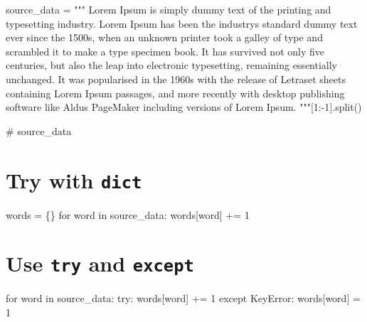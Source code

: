\documentclass[
  letterpaper,
  DIV=11,
  numbers=noendperiod]{scrreprt}
\newenvironment{Shaded}{\begin{snugshade}}{\end{snugshade}}
\newcommand{\CommentTok}[1]{\textcolor[rgb]{0.37,0.37,0.37}{#1}}
\newcommand{\ControlFlowTok}[1]{\textcolor[rgb]{0.00,0.23,0.31}{#1}}
\newcommand{\DecValTok}[1]{\textcolor[rgb]{0.68,0.00,0.00}{#1}}
\newcommand{\KeywordTok}[1]{\textcolor[rgb]{0.00,0.23,0.31}{#1}}
\newcommand{\NormalTok}[1]{\textcolor[rgb]{0.00,0.23,0.31}{#1}}
\newcommand{\OperatorTok}[1]{\textcolor[rgb]{0.37,0.37,0.37}{#1}}
\newcommand{\PreprocessorTok}[1]{\textcolor[rgb]{0.68,0.00,0.00}{#1}}
\newcommand{\StringTok}[1]{\textcolor[rgb]{0.13,0.47,0.30}{#1}}
\begin{document}
\begin{Shaded}
\begin{Highlighting}[]
\NormalTok{source\_data }\OperatorTok{=} \StringTok{"""}
\StringTok{Lorem Ipsum is simply dummy text of the printing and typesetting industry. }
\StringTok{Lorem Ipsum has been the industry\textquotesingle{}s standard dummy text ever since the 1500s, }
\StringTok{when an unknown printer took a galley of type and scrambled it to make a type }
\StringTok{specimen book. It has survived not only five centuries, but also the leap }
\StringTok{into electronic typesetting, remaining essentially unchanged. It was }
\StringTok{popularised in the 1960s with the release of Letraset sheets containing }
\StringTok{Lorem Ipsum passages, and more recently with desktop publishing software }
\StringTok{like Aldus PageMaker including versions of Lorem Ipsum.}
\StringTok{"""}\NormalTok{[}\DecValTok{1}\NormalTok{:}\OperatorTok{{-}}\DecValTok{1}\NormalTok{].split()}
\end{Highlighting}
\end{Shaded}

\begin{Shaded}
\begin{Highlighting}[]
\CommentTok{\# source\_data}
\end{Highlighting}
\end{Shaded}

\hypertarget{try-with-dict-1}{%
\section{\texorpdfstring{Try with
\texttt{dict}}{Try with dict}}\label{try-with-dict-1}}

\begin{Shaded}
\begin{Highlighting}[]
\NormalTok{words }\OperatorTok{=}\NormalTok{ \{\}}
\ControlFlowTok{for}\NormalTok{ word }\KeywordTok{in}\NormalTok{ source\_data:}
\NormalTok{    words[word] }\OperatorTok{+=} \DecValTok{1}
\end{Highlighting}
\end{Shaded}

\hypertarget{use-try-and-except-1}{%
\section{\texorpdfstring{Use \texttt{try} and
\texttt{except}}{Use try and except}}\label{use-try-and-except-1}}

\begin{Shaded}
\begin{Highlighting}[]
\ControlFlowTok{for}\NormalTok{ word }\KeywordTok{in}\NormalTok{ source\_data:}
    \ControlFlowTok{try}\NormalTok{:}
\NormalTok{        words[word] }\OperatorTok{+=} \DecValTok{1}
    \ControlFlowTok{except} \PreprocessorTok{KeyError}\NormalTok{:}
\NormalTok{        words[word] }\OperatorTok{=} \DecValTok{1}
\end{Highlighting}
\end{Shaded}
\end{document}
